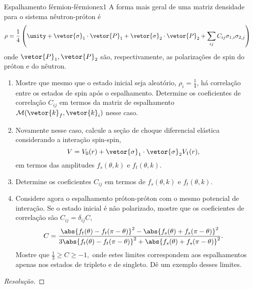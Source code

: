\begin{exercício}{Espalhamento férmion-férmion}{ex1}
   A forma mais geral de uma matriz densidade para o sistema nêutron-próton é
   \begin{equation*}
      \rho = \frac14 \left(\unity + \vetor{\sigma}_1 \cdot \vetor{P}_1 + \vetor{\sigma}_2 \cdot \vetor{P}_2 + \sum_{ij}C_{ij}{\sigma_{1,i}\sigma_{2,j}}\right)
   \end{equation*}
   onde \(\vetor{P}_1,\vetor{P}_2\) são, respectivamente, as polarizações de spin do próton e do nêutron.
   \begin{enumerate}[label=(\alph*)]
      \item Mostre que mesmo que o estado inicial seja aleatório, \(\rho_i = \frac14\), há correlação entre os estados de spin após o espalhamento. Determine os coeficientes de correlação \(C_{ij}\) em termos da matriz de espalhamento \(\mathcal{M}(\vetor{k}_f,\vetor{k}_i)\) nesse caso.
      \item Novamente nesse caso, calcule a seção de choque diferencial elástica considerando a interação spin-spin,
         \begin{equation*}
            V = V_0(r) + \vetor{\sigma}_1 \cdot \vetor{\sigma}_2 V_1(r),
         \end{equation*}
         em termos das amplitudes \(f_{s}(\theta, k)\) e \(f_t(\theta,k).\)
      \item Determine os coeficientes \(C_{ij}\) em termos de \(f_s(\theta,k)\) e \(f_t(\theta,k).\)
      \item Considere agora o espalhamento próton-próton com o mesmo potencial de interação. Se o estado inicial é não polarizado, mostre que os coeficientes de correlação são \(C_{ij} = \delta_{ij} C,\)
         \begin{equation*}
            C = \frac{\abs{f_t(\theta) - f_t(\pi - \theta)}^2 - \abs{f_s(\theta) + f_s(\pi - \theta)}^2}{3 \abs{f_t(\theta) - f_t(\pi - \theta)}^2 + \abs{f_s(\theta) + f_s(\pi - \theta)}^2}.
         \end{equation*}
         Mostre que \(\frac13 \geq C \geq -1,\) onde estes limites correspondem aos espalhamentos apenas nos estados de tripleto e de singleto. Dê um exemplo desses limites.
   \end{enumerate}
\end{exercício}
\begin{proof}[Resolução]
    
\end{proof}
